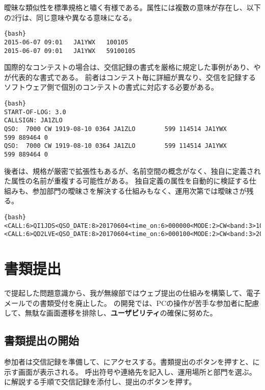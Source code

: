 \documentclass[10pt,a4paper]{book}
\begin{document}
曖昧な類似性を標準規格と嘯く有様である。属性には複数の意味が存在し、以下の2行は、同じ意味や異なる意味になる。

\begin{Verbatim}{bash}
2015-06-07 09:01   JA1YWX   100105
2015-06-07 09:01   JA1YWX   59100105
\end{Verbatim}

国際的なコンテストの場合は、交信記録の書式を厳格に規定した事例があり、\cbr{}や\adi{}が代表的な書式である。
前者はコンテスト毎に詳細が異なり、交信を記録するソフトウェア側で個別のコンテストの書式に対応する必要がある。

\begin{Verbatim}{bash}
START-OF-LOG: 3.0
CALLSIGN: JA1ZLO
QSO:  7000 CW 1919-08-10 0364 JA1ZLO        599 114514 JA1YWX        599 889464 0
QSO:  7000 CW 1919-08-10 0364 JA1ZLO        599 114514 JA1YWX        599 889464 0
\end{Verbatim}

後者は、規格が厳密で拡張性もあるが、名前空間の概念がなく、独自に定義された属性の名前が重複する可能性がある。
独自定義の属性を自動的に検証する仕組みも、参加部門の曖昧さを解決する仕組みもなく、運用次第では曖昧さが残る。

\begin{Verbatim}{bash}
<CALL:6>QI1JDS<QSO_DATE:8>20170604<time_on:6>000000<MODE:2>CW<band:3>10m<RST_RCVD:3>599<SRX:4>1005<eor>
<CALL:6>QD2LVE<QSO_DATE:8>20170604<time_on:6>000100<MODE:2>CW<band:3>20m<RST_RCVD:3>599<SRX:4>1336<eor>
\end{Verbatim}

\chapter{書類提出}

で提起した問題意識から、我が無線部ではウェブ提出の仕組みを構築して、電子メールでの書類受付を廃止した。
の開発では、PCの操作が苦手な参加者に配慮して、無駄な画面遷移を排除し、\textbf{ユーザビリティ}の確保に努めた。

\section{書類提出の開始\label{sect:entry}}

参加者は交信記録を準備して、にアクセスする。書類提出のボタンを押すと、に示す画面が表示される。
呼出符号や連絡先を記入し、運用場所と部門を選ぶ。に解説する手順で交信記録を添付し、提出のボタンを押す。
\end{document}

